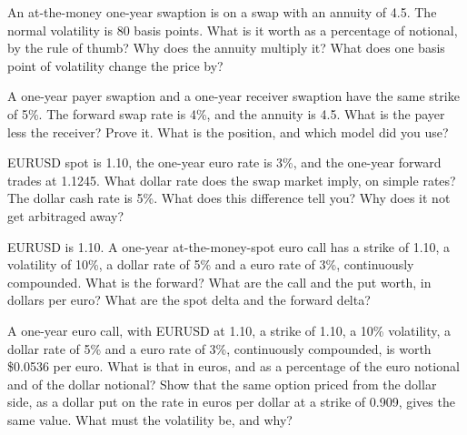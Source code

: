 \begin{question}\label{iq:iv2:rates-and-fx:27}
An at-the-money one-year swaption is on a swap with an annuity of 4.5. The normal volatility is 80 basis points. What is it worth as a percentage of notional, by the rule of thumb? Why does the annuity multiply it? What does one basis point of volatility change the price by?
\end{question}

\begin{question}\label{iq:iv2:rates-and-fx:28}
A one-year payer swaption and a one-year receiver swaption have the same strike of 5\%. The forward swap rate is 4\%, and the annuity is 4.5. What is the payer less the receiver? Prove it. What is the position, and which model did you use?
\end{question}

\begin{question}\label{iq:iv2:rates-and-fx:29}
EURUSD spot is 1.10, the one-year euro rate is 3\%, and the one-year forward trades at 1.1245. What dollar rate does the swap market imply, on simple rates? The dollar cash rate is 5\%. What does this difference tell you? Why does it not get arbitraged away?
\end{question}

\begin{question}\label{iq:iv2:rates-and-fx:30}
EURUSD is 1.10. A one-year at-the-money-spot euro call has a strike of 1.10, a volatility of 10\%, a dollar rate of 5\% and a euro rate of 3\%, continuously compounded. What is the forward? What are the call and the put worth, in dollars per euro? What are the spot delta and the forward delta?
\end{question}

\begin{question}\label{iq:iv2:rates-and-fx:31}
A one-year euro call, with EURUSD at 1.10, a strike of 1.10, a 10\% volatility, a dollar rate of 5\% and a euro rate of 3\%, continuously compounded, is worth \$0.0536 per euro. What is that in euros, and as a percentage of the euro notional and of the dollar notional? Show that the same option priced from the dollar side, as a dollar put on the rate in euros per dollar at a strike of 0.909, gives the same value. What must the volatility be, and why?
\end{question}

